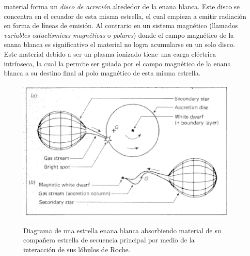 {material forma un \textit{disco de acreción} alrededor de la enana blanca. Este
disco se concentra en el ecuador de esta misma estrella, el cual empieza a
emitir radiación en forma de líneas de emisión. Al contrario en un sistema
magnético (llamados \textit{variables cataclísmicas magnéticas} o
\textit{polares}) donde el campo magnético de la enana blanca es significativo
el material no logra acumularse en un solo disco. Este material debido a ser un
plasma ionizado tiene una carga eléctrica intrínseca, la cual la permite ser
guiada por el campo magnético de la enana blanca a su destino final al polo
magnético de esta misma estrella. \\\newline
\begin{figure}
	\centering
	\includegraphics[scale=0.4]{Introduccion/Figures/Figura Acrecion_SmithReview.png}
	\caption{Diagrama de una estrella enana blanca absorbiendo material de su
		compañera estrella de secuencia principal por medio de la interacción de sus
		lóbulos de Roche.} \citet{smithReview}
	\label{acrecionSmithReview}
\end{figure}

}
